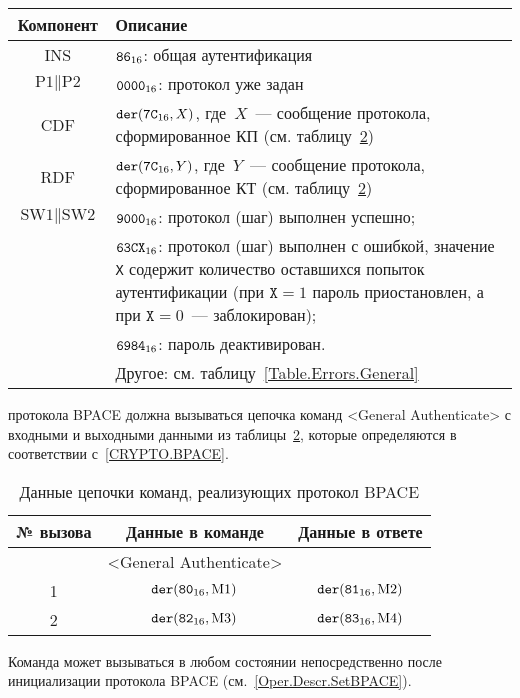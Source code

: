 \begin{table}[hbt]
\caption{}\label{Table.Oper.GABPACECmd}
\begin{tabular}{|c|p{14cm}|}
\hline
Компонент & 	Описание \\
\hline
\hline
INS & $\texttt{86}_{16}$: общая аутентификация \\
\hline
$\text{P1} \parallel \text{P2}$ & $\texttt{0000}_{16}$: протокол уже задан\\ 
\hline
CDF & $\texttt{der}(\texttt{7C}_{16}, X)$, 
где~$X$~--- сообщение протокола, сформированное КП (см. 
таблицу~\ref{Table.Oper.BPACE})\\ 
\hline 
RDF & $\texttt{der}(\texttt{7C}_{16}, Y)$, где~$Y$~--- 
сообщение протокола, сформированное КТ (см. таблицу~\ref{Table.Oper.BPACE})\\
\hline
$\text{SW1} \parallel \text{SW2}$ & 
  $\texttt{9000}_{16}$: протокол (шаг) выполнен успешно; \\
  & $\texttt{63CX}_{16}$: протокол (шаг) выполнен с ошибкой, 
значение \texttt{X} содержит количество оставшихся попыток аутентификации 
(при $\texttt{X} = 1$ пароль приостановлен, а при $\texttt{X} = 0$~--- 
заблокирован); \\
  & $\texttt{6984}_{16}$: пароль деактивирован. \\
  & Другое: см. таблицу~\ref{Table.Errors.General} \\
\hline
\end{tabular}
\end{table}

 протокола BPACE должна вызываться цепочка 
команд <General Authenticate> с входными и выходными данными 
из таблицы~\ref{Table.Oper.BPACE}, 
которые определяются в соответствии с~\ref{CRYPTO.BPACE}. 

\begin{table}[hbt]
\caption{Данные цепочки команд, реализующих протокол BPACE}
\label{Table.Oper.BPACE}
\begin{tabular}{|c|c|c|}
\hline
№ вызова & Данные в команде & Данные в ответе\\
\hline
\hline
 & <General Authenticate> &  \\
\hline
\hline
1 & $\texttt{der}(\texttt{80}_{16}, \text{M1})$ & 
$\texttt{der}(\texttt{81}_{16}, \text{M2})$\\
\hline
2 & $\texttt{der}(\texttt{82}_{16}, \text{M3})$ & 
$\texttt{der}(\texttt{83}_{16}, \text{M4})$\\
\hline
\end{tabular}
\end{table}

Команда может вызываться  в любом состоянии
непосредственно после инициализации протокола BPACE 
(см.~\ref{Oper.Descr.SetBPACE}).

